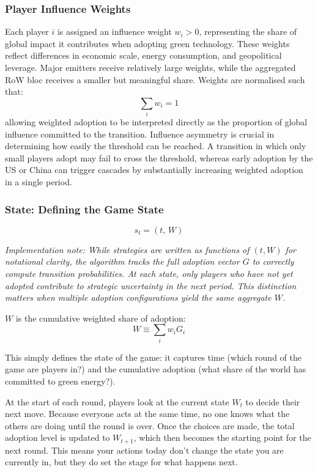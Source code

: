 \documentclass[12pt,a4paper]{article}
\begin{document}
\subsubsection{Player Influence Weights}

Each player $i$ is assigned an influence weight $w_i > 0$, representing the share of global impact it contributes when adopting green technology. These weights reflect differences in economic scale, energy consumption, and geopolitical leverage. Major emitters receive relatively large weights, while the aggregated RoW bloc receives a smaller but meaningful share. Weights are normalised such that:
\[
  \sum_i w_i = 1
\]
allowing weighted adoption to be interpreted directly as the proportion of global influence committed to the transition. Influence asymmetry is crucial in determining how easily the threshold can be reached. A transition in which only small players adopt may fail to cross the threshold, whereas early adoption by the US or China can trigger cascades by substantially increasing weighted adoption in a single period.

\subsubsection{State: Defining the Game State}

\[
  s_t = (t,\, W)
\]

\textit{Implementation note: While strategies are written as functions of $(t, W)$ for notational clarity, the algorithm tracks the full adoption vector $G$ to correctly compute transition probabilities. At each state, only players who have not yet adopted contribute to strategic uncertainty in the next period. This distinction matters when multiple adoption configurations yield the same aggregate $W$.}

$W$ is the cumulative weighted share of adoption:
\[
  W \equiv \sum_i w_i G_i
\]

This simply defines the state of the game: it captures time (which round of the game are players in?) and the cumulative adoption (what share of the world has committed to green energy?).

At the start of each round, players look at the current state $W_t$ to decide their next move. Because everyone acts at the same time, no one knows what the others are doing until the round is over. Once the choices are made, the total adoption level is updated to $W_{t+1}$, which then becomes the starting point for the next round. This means your actions today don't change the state you are currently in, but they do set the stage for what happens next.
\end{document}
